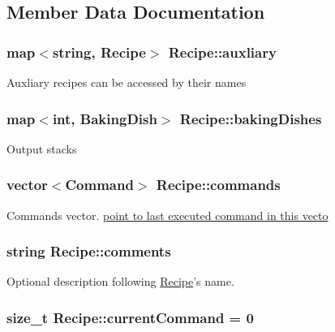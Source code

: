 \subsection{Member Data Documentation}
\hypertarget{classRecipe_af7f123d033d11cc87b2113c7a208cd83}{
\subsubsection[{auxliary}]{\setlength{\rightskip}{0pt plus 5cm}map$<$string, {\bf Recipe}$>$ Recipe\-::auxliary\hspace{0.3cm}{\ttfamily [private]}}}\label{classRecipe_af7f123d033d11cc87b2113c7a208cd83}
Auxliary recipes can be accessed by their names \hypertarget{classRecipe_aae370ab1573cc3222fa5a77c9ed5cee4}{
\subsubsection[{baking\-Dishes}]{\setlength{\rightskip}{0pt plus 5cm}map$<$int, {\bf Baking\-Dish}$>$ Recipe\-::baking\-Dishes\hspace{0.3cm}{\ttfamily [private]}}}\label{classRecipe_aae370ab1573cc3222fa5a77c9ed5cee4}
Output stacks \hypertarget{classRecipe_ae1419284a891adb4ae550d6ea4c76df8}{
\subsubsection[{commands}]{\setlength{\rightskip}{0pt plus 5cm}vector$<${\bf Command}$>$ Recipe\-::commands\hspace{0.3cm}{\ttfamily [private]}}}\label{classRecipe_ae1419284a891adb4ae550d6ea4c76df8}
Commands vector. \hyperlink{}{point to last executed command in this vecto }\hypertarget{classRecipe_a280b7e012414b5e22332b8a7580b371f}{
\subsubsection[{comments}]{\setlength{\rightskip}{0pt plus 5cm}string Recipe\-::comments}}\label{classRecipe_a280b7e012414b5e22332b8a7580b371f}
Optional description following \hyperlink{classRecipe}{Recipe}'s name. \hypertarget{classRecipe_ab29f1a07d6c30a5c7b4da4ab53822c49}{
\subsubsection[{current\-Command}]{\setlength{\rightskip}{0pt plus 5cm}size\-\_\-t Recipe\-::current\-Command = 0\hspace{0.3cm}{\ttfamily [private]}}}\label{classRecipe_ab29f1a07d6c30a5c7b4da4ab53822c49}
